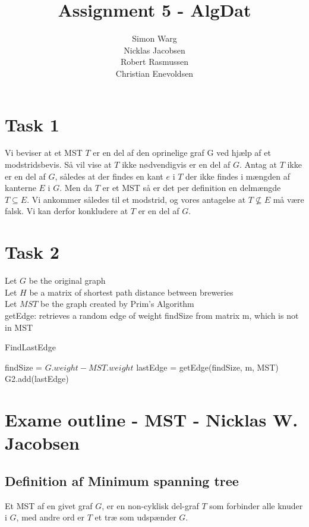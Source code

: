 \documentclass[12pt]{article}
\title{Assignment 5 - AlgDat}
\author{Simon Warg\\Nicklas Jacobsen\\Robert Rasmussen\\Christian Enevoldsen}
\begin{document}
\maketitle 

\newpage
\section*{Task 1}
Vi beviser at et MST $T$ er en del af den oprinelige graf G ved hjælp af et modstridsbevis. Så vil vise at $T$ ikke nødvendigvis er en del af $G$. Antag at $T$ ikke er en del af $G$, således at der findes en kant $e$ i $T$ der ikke findes i mængden af kanterne $E$ i $G$. Men da $T$ er et MST så er det per definition en delmængde $T \subseteq E$. Vi ankommer således til et modstrid, og vores antagelse at $T \nsubseteq E$ må være falsk. Vi kan derfor konkludere at $T$ er en del af $G$.
 
\section*{Task 2}
Let $G$ be the original graph\\
Let $H$ be a matrix of shortest path distance between breweries\\
Let $MST$ be the graph created by Prim's Algorithm\\
getEdge: retrieves a random edge of weight findSize from matrix m,
  which is not in MST
\begin{algorithm}
 \caption{FindLastEdge}
 \begin{algorithmic}
		\State findSize = $G.weight - MST.weight$
		\State lastEdge = getEdge(findSize, m, MST)
		\State G2.add(lastEdge)
	\EndFunction
\end{algorithmic}
\end{algorithm}
\newpage
\section*{Exame outline - MST - Nicklas W. Jacobsen}
\subsection*{Definition af Minimum spanning tree}
Et MST af en givet graf $G$, er en non-cyklisk del-graf $T$ som forbinder alle knuder i $G$, med andre ord er $T$ et træ som udspænder $G$.
\end{document}
